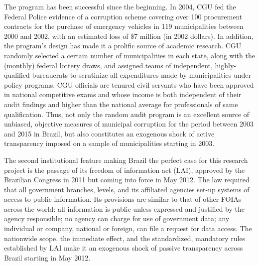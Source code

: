 \documentclass[11pt]{article}
\begin{document}
The program has been successful since the beginning. In 2004, CGU fed the Federal Police evidence of a corruption scheme covering over 100 procurement contracts for the purchase of emergency vehicles in 119 municipalities between 2000 and 2002, with an estimated loss of \$7 million (in 2002 dollars). In addition, the program's design has made it a prolific source of academic research. CGU randomly selected a certain number of municipalities in each state, along with the (monthly) federal lottery draws, and assigned teams of independent, highly-qualified bureaucrats to scrutinize all expenditures made by municipalities under policy programs. CGU officials are tenured civil servants who have been approved in national competitive exams and whose income is both independent of their audit findings and higher than the national average for professionals of same qualification. Thus, not only the random audit program is an excellent source of unbiased, objective measures of municipal corruption for the period between 2003 and 2015 in Brazil, but also constitutes an exogenous shock of active transparency imposed on a sample of municipalities starting in 2003.

The second institutional feature making Brazil the perfect case for this research project is the passage of its freedom of information act (LAI), approved by the Brazilian Congress in 2011 but coming into force in May 2012. The law required that all government branches, levels, and its affiliated agencies set-up systems of access to public information. Its provisions are similar to that of other FOIAs across the world: all information is public unless expressed and justified by the agency responsible; no agency can charge for use of government data; any individual or company, national or foreign, can file a request for data access. The nationwide scope, the immediate effect, and the standardized, mandatory rules established by LAI make it an exogenous shock of passive transparency across Brazil starting in May 2012.
\end{document}
